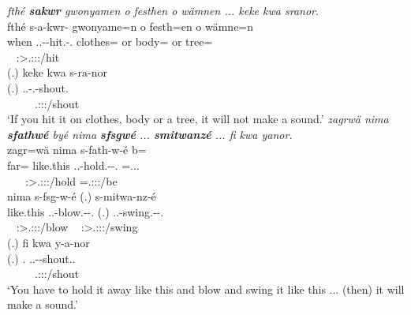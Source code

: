 \begin{exe}
\ex
\label{ex373}
\begin{xlist}
	\ex
	\emph{fthé \textbf{sakwr} gwonyamen o festhen o wämnen ... keke kwa sranor}.\\
	\glll fthé s-a-kwr-\Zero{} gwonyame=n o festh=en o wämne=n\\
	when \Tsg.\Masc.\Alph-\Ndu-hit.\Rs-\Ssg.{\Imp} clothes={\Loc} or body={\Loc} or tree={\Loc}\\
	~ {\footnotesize \Fsg:\Sbj>\Tsg.\Masc:\Obj:\Imp:\Pfv/hit} ~ ~ ~ ~ ~\\
	\sn
	\glll (.) keke kwa s-ra-nor\\
	(.) {\Neg} {\Fut} \Tsg.\Masc.\Bet-\Irr.\Vc-shout.\Ext\\
	~ ~ ~ {\footnotesize \Tsg.\Masc:\Sbj:\Irr:\Ipfv/shout}\\
	\trans `If you hit it on clothes, body or a tree, it will not make a sound.'
	\label{ex372}
	\ex
	\emph{zagrwä nima \textbf{sfathwé} byé nima \textbf{sfsgwé} ... \textbf{smitwanzé} ... fi kwa yanor.}\\
	\glll zagr=wä nima s-fath-w-é b= \\
	far={\Emph} like.this \Tsg.\Masc.\Bet-hold.\Ext-\Ndu-\Ssg.{\Imp} \Med=\Tsg.\Masc.\Cop.{\Ndu}\\
	~ ~ {\footnotesize \Ssg:\Sbj>\Tsg.\Masc:\Obj:\Imp:\Ipfv/hold} {\footnotesize \Med=\Tsg.\Masc:\Sbj:\Nonpast:\Ipfv/be}\\
	\sn
	\glll nima s-fsg-w-é (.) s-mitwa-nz-é\\
	like.this \Tsg.\Masc.\Bet-blow.\Ext-\Ndu-\Ssg.{\Imp} (.) \Tsg.\Masc.\Bet-swing.\Ext-\Ndu-\Ssg.{\Imp}\\
	~ {\footnotesize \Ssg:\Sbj>\Tsg.\Masc:\Obj:\Imp:\Ipfv/blow} ~ {\footnotesize \Ssg:\Sbj>\Tsg.\Masc:\Obj:\Imp:\Ipfv/swing}\\
	\sn
	\glll (.) fi kwa y-a-nor\\
	(.) \Third.{\Abs} {\Fut} \Tsg.\Masc.\Alph-\Vc-shout.\Ext.\Ndu\\
	~ ~ ~ \footnotesize {\footnotesize \Tsg.\Masc:\Sbj:\Nonpast:\Ipfv/shout}\\
	\trans `You have to hold it away like this and blow and swing it like this ... (then) it will make a sound.' 
	\label{ex371}
\end{xlist}
\end{exe}

